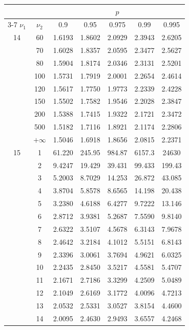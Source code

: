 \hfill
\begin{minipage}{0.49\textwidth}
	\begin{center}
		\begin{tabular}{ccccccc}
			& & \multicolumn{5}{c}{$p$}\\
			\cline{3-7}
			$\nu_1$ & $\nu_2$ & 0.9 & 0.95 & 0.975 & 0.99 & 0.995 \\
			\midrule
			14 & 60 & 1.6193 & 1.8602 & 2.0929 & 2.3943 & 2.6205 \\
			& 70 & 1.6028 & 1.8357 & 2.0595 & 2.3477 & 2.5627 \\
			& 80 & 1.5904 & 1.8174 & 2.0346 & 2.3131 & 2.5201 \\
			& 100 & 1.5731 & 1.7919 & 2.0001 & 2.2654 & 2.4614 \\
			& 120 & 1.5617 & 1.7750 & 1.9773 & 2.2339 & 2.4228 \\
			& 150 & 1.5502 & 1.7582 & 1.9546 & 2.2028 & 2.3847 \\
			& 200 & 1.5388 & 1.7415 & 1.9322 & 2.1721 & 2.3472 \\
			& 500 & 1.5182 & 1.7116 & 1.8921 & 2.1174 & 2.2806 \\
			& $+\infty$ & 1.5046 & 1.6918 & 1.8656 & 2.0815 & 2.2371 \\
			\midrule
			15 & 1 & 61.220 & 245.95 & 984.87 & 6157.3 & 24630 \\
			& 2 & 9.4247 & 19.429 & 39.431 & 99.433 & 199.43 \\
			& 3 & 5.2003 & 8.7029 & 14.253 & 26.872 & 43.085 \\
			& 4 & 3.8704 & 5.8578 & 8.6565 & 14.198 & 20.438 \\
			& 5 & 3.2380 & 4.6188 & 6.4277 & 9.7222 & 13.146 \\
			& 6 & 2.8712 & 3.9381 & 5.2687 & 7.5590 & 9.8140 \\
			& 7 & 2.6322 & 3.5107 & 4.5678 & 6.3143 & 7.9678 \\
			& 8 & 2.4642 & 3.2184 & 4.1012 & 5.5151 & 6.8143 \\
			& 9 & 2.3396 & 3.0061 & 3.7694 & 4.9621 & 6.0325 \\[5pt]
			& 10 & 2.2435 & 2.8450 & 3.5217 & 4.5581 & 5.4707 \\
			& 11 & 2.1671 & 2.7186 & 3.3299 & 4.2509 & 5.0489 \\
			& 12 & 2.1049 & 2.6169 & 3.1772 & 4.0096 & 4.7213 \\
			& 13 & 2.0532 & 2.5331 & 3.0527 & 3.8154 & 4.4600 \\
			& 14 & 2.0095 & 2.4630 & 2.9493 & 3.6557 & 4.2468 \\

\end{tabular}
\end{center}
\end{minipage}
